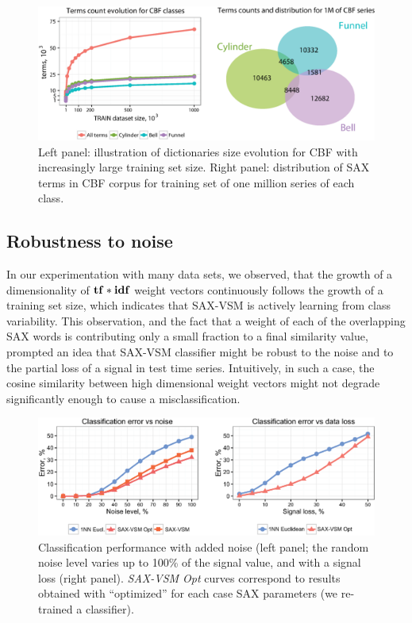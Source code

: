 \begin{figure}[h!]
   \centering
   \includegraphics[width=135mm]{figures/Bubbles.eps}
   \caption{Left panel: illustration of dictionaries size evolution for CBF with
   increasingly large training set size. 
   Right panel: distribution of SAX terms in CBF corpus for training set of 
   one million series of each class.}
   \label{fig:venn}
\end{figure}

\subsection{Robustness to noise}
In our experimentation with many data sets, we observed, that the growth of a 
dimensionality of $\text{\textbf{tf}}\ast\text{\textbf{idf}}$ weight vectors continuously follows the growth of a
training set size, which indicates that SAX-VSM is actively learning from class variability.
This observation, and the fact that a weight of each of the overlapping SAX words is 
contributing only a small fraction to a final similarity value, prompted an idea that 
SAX-VSM classifier might be robust to the noise and to the partial loss of a signal in
test time series. Intuitively, in such a case, the cosine similarity between high dimensional 
weight vectors might not degrade significantly enough to cause a misclassification.

\begin{figure}[t]
  \centering
  \includegraphics[width=140mm]{figures/corrupted.eps}
  \caption{Classification performance with added noise
  (left panel; the random noise level varies up to 100\% of the signal value,
  and with a signal loss (right panel). \textit{SAX-VSM Opt} curves correspond to 
  results obtained with ``optimized'' for each case SAX parameters 
  (we re-trained a classifier).}
  \label{fig:corrupted}
\end{figure}


